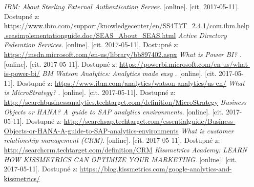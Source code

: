 \begin{thebibliography}{99}
\textit{IBM: About Sterling External Authentication Server}.
[online]. [cit. 2017-05-11]. Dostupné z: \url{https://www.ibm.com/support/knowledgecenter/en/SS4T7T_2.4.1/com.ibm.help.seasimplementationguide.doc/SEAS_About_SEAS.html}
\textit{Active Directory Federation Services}.
[online]. [cit. 2017-05-11]. Dostupné z: \url{https://msdn.microsoft.com/en-us/library/bb897402.aspx}
\textit{What is Power BI? }.
[online]. [cit. 2017-05-11]. Dostupné z:  \url{https://powerbi.microsoft.com/en-us/what-is-power-bi/}
\textit{BM Watson Analytics: Analytics made easy }.
[online]. [cit. 2017-05-11]. Dostupné z: \url{https://www.ibm.com/analytics/watson-analytics/us-en/}
\textit{What is MicroStrategy? }.
[online]. [cit. 2017-05-11]. Dostupné z: \url{http://searchbusinessanalytics.techtarget.com/definition/MicroStrategy}
\textit{Business Objects or HANA? A~guide to SAP analytics environments}.
[online]. [cit. 2017-05-11]. Dostupné z: \url{http://searchsap.techtarget.com/essentialguide/Business-Objects-or-HANA-A-guide-to-SAP-analytics-environments}
\textit{What is customer relationship management (CRM)}.
[online]. [cit. 2017-05-11]. Dostupné z: \url{http://searchcrm.techtarget.com/definition/CRM}
\textit{Kissmetrics Academy: LEARN HOW KISSMETRICS CAN OPTIMIZE YOUR MARKETING}.
[online]. [cit. 2017-05-11]. Dostupné z: \url{https://blog.kissmetrics.com/google-analytics-and-kissmetrics/}
\label{LastPage}
\end{thebibliography}
